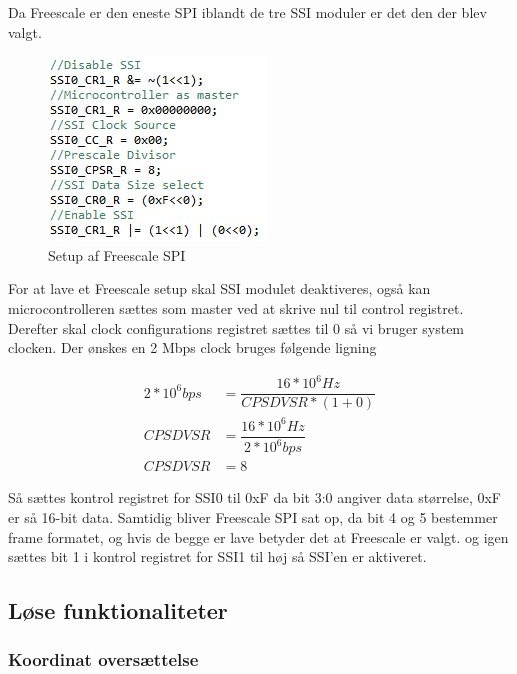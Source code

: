 Da Freescale er den eneste SPI iblandt de tre SSI moduler er det den der blev valgt.

		\begin{figure}[ht]
			\begin{center}
			\includegraphics[scale=0.8]{Billeder/Spi_Setup.jpg}
			\end{center}
			\label{fig:SPI_Setup}
			\caption{Setup af Freescale SPI}
		\end{figure}

For at lave et Freescale setup skal SSI modulet deaktiveres, også kan microcontrolleren sættes som master ved at skrive nul til control registret.
Derefter skal clock configurations registret sættes til 0 så vi bruger system clocken.
Der ønskes en 2 Mbps clock bruges følgende ligning

\begin{align*}
2*10^6 bps &= \dfrac{16*10^6 Hz}{CPSDVSR * (1 + 0)}\\
CPSDVSR &= \dfrac{16*10^6 Hz}{2*10^6 bps}\\
CPSDVSR &= 8
\end{align*}

Så sættes kontrol registret for SSI0 til 0xF da bit 3:0 angiver data størrelse, 0xF er så 16-bit data. Samtidig bliver Freescale SPI sat op, da bit 4 og 5 bestemmer frame formatet, og hvis de begge er lave betyder det at Freescale er valgt. 
og igen sættes bit 1 i kontrol registret for SSI1 til høj så SSI'en er aktiveret.

\subsection{Løse funktionaliteter}

\subsubsection{Koordinat oversættelse}

